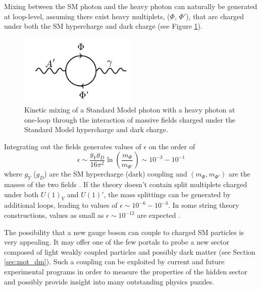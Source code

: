 Mixing between the
SM photon and the heavy photon can naturally be generated at loop-level,
assuming there exist heavy multiplets, ($\Phi$, $\Phi'$), 
that are charged under both the SM hypercharge and dark charge 
(see Figure \ref{fig:ap_loop}).
\begin{figure}
    \centering
    \includegraphics[width=0.5\textwidth]{images/aprime_loop.png}
    \caption{Kinetic mixing of a Standard Model photon with a heavy photon 
    at one-loop through the interaction of massive fields charged under
    the Standard Model hypercharge and dark charge.}
    \label{fig:ap_loop}
\end{figure}
Integrating out the fields generates values of $\epsilon$ on the order of 
\begin{equation}
    \epsilon \sim \frac{g_Yg_D}{16\pi^2}\ln\left(\frac{m_{\Phi}}{m_{\Phi'}} \right)
             \sim 10^{-3} - 10^{-1} 
\end{equation}
where $g_Y$ ($g_D$) are the SM hypercharge (dark) coupling and 
$(m_{\Phi}, m_{\Phi'})$ are the masses of the two fields 
\cite{ArkaniHamed:2008qp, Bjorken:2009mm}.  If the theory doesn't contain 
split multiplets charged under both $U(1)_Y$ and $U(1)'$, the mass splittings 
can be generated by additional loops, leading to values of $\epsilon \sim 10^{-6} - 10^{-3}$. 
In some string theory constructions, 
values as small as $\epsilon \sim 10^{-12}$ are expected 
\cite{Goodsell:2010ie,Goodsell:2009xc, Cicoli:2011yh}.

%
%

The possibility that a new gauge boson can couple to charged SM particles is 
very appealing.  It may offer one of the few portals to probe a new sector 
composed of light weakly coupled particles and possibly dark matter
(see Section \ref{sec:mot_dm}).  Such a coupling can be exploited by current and future
experimental programs in order to measure the properties of
the hidden sector and possibly provide insight into many outstanding physics 
puzzles.

